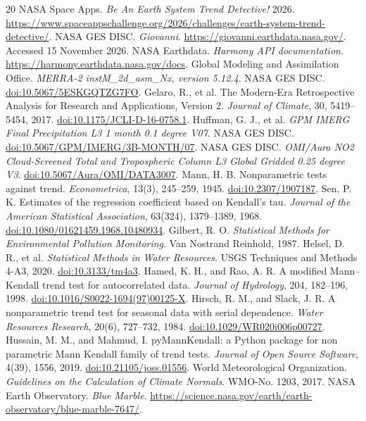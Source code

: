 \documentclass[10pt,a4paper,twocolumn]{article}
\begin{document}
\begin{thebibliography}{20}
\small
{} NASA Space Apps. \emph{Be An Earth System Trend Detective!} 2026. \url{https://www.spaceappschallenge.org/2026/challenges/earth-system-trend-detective/}.
 NASA GES DISC. \emph{Giovanni}. \url{https://giovanni.earthdata.nasa.gov/}. Accessed 15 November 2026.
 NASA Earthdata. \emph{Harmony API documentation}. \url{https://harmony.earthdata.nasa.gov/docs}.
 Global Modeling and Assimilation Office. \emph{MERRA-2 instM\_2d\_asm\_Nx, version 5.12.4}. NASA GES DISC. \href{https://doi.org/10.5067/5ESKGQTZG7FO}{doi:10.5067/5ESKGQTZG7FO}.
 Gelaro, R., et al. The Modern-Era Retrospective Analysis for Research and Applications, Version 2. \emph{Journal of Climate}, 30, 5419--5454, 2017. \href{https://doi.org/10.1175/JCLI-D-16-0758.1}{doi:10.1175/JCLI-D-16-0758.1}.
 Huffman, G. J., et al. \emph{GPM IMERG Final Precipitation L3 1 month 0.1 degree V07}. NASA GES DISC. \href{https://doi.org/10.5067/GPM/IMERG/3B-MONTH/07}{doi:10.5067/GPM/IMERG/3B-MONTH/07}.
 NASA GES DISC. \emph{OMI/Aura NO2 Cloud-Screened Total and Tropospheric Column L3 Global Gridded 0.25 degree V3}. \href{https://doi.org/10.5067/Aura/OMI/DATA3007}{doi:10.5067/Aura/OMI/DATA3007}.
 Mann, H. B. Nonparametric tests against trend. \emph{Econometrica}, 13(3), 245--259, 1945. \href{https://doi.org/10.2307/1907187}{doi:10.2307/1907187}.
 Sen, P. K. Estimates of the regression coefficient based on Kendall's tau. \emph{Journal of the American Statistical Association}, 63(324), 1379--1389, 1968. \href{https://doi.org/10.1080/01621459.1968.10480934}{doi:10.1080/01621459.1968.10480934}.
 Gilbert, R. O. \emph{Statistical Methods for Environmental Pollution Monitoring}. Van Nostrand Reinhold, 1987.
 Helsel, D. R., et al. \emph{Statistical Methods in Water Resources}. USGS Techniques and Methods 4-A3, 2020. \href{https://doi.org/10.3133/tm4a3}{doi:10.3133/tm4a3}.
 Hamed, K. H., and Rao, A. R. A modified Mann--Kendall trend test for autocorrelated data. \emph{Journal of Hydrology}, 204, 182--196, 1998. \href{https://doi.org/10.1016/S0022-1694(97)00125-X}{doi:10.1016/S0022-1694(97)00125-X}.
 Hirsch, R. M., and Slack, J. R. A nonparametric trend test for seasonal data with serial dependence. \emph{Water Resources Research}, 20(6), 727--732, 1984. \href{https://doi.org/10.1029/WR020i006p00727}{doi:10.1029/WR020i006p00727}.
 Hussain, M. M., and Mahmud, I. pyMannKendall: a Python package for non parametric Mann Kendall family of trend tests. \emph{Journal of Open Source Software}, 4(39), 1556, 2019. \href{https://doi.org/10.21105/joss.01556}{doi:10.21105/joss.01556}.
 World Meteorological Organization. \emph{Guidelines on the Calculation of Climate Normals}. WMO-No. 1203, 2017.
 NASA Earth Observatory. \emph{Blue Marble}. \url{https://science.nasa.gov/earth/earth-observatory/blue-marble-7647/}.
\end{thebibliography}
\end{document}
